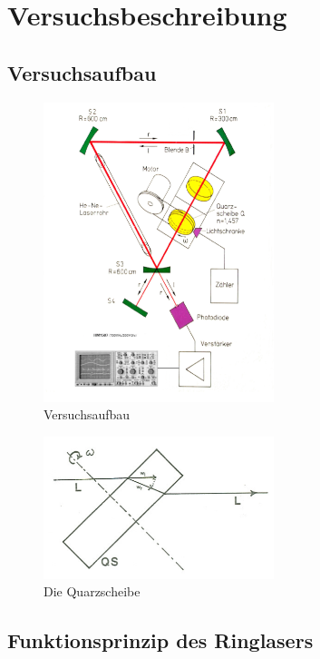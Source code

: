 \section{Versuchsbeschreibung}

\subsection{Versuchsaufbau}

\begin{figure}[H]
	\centering \includegraphics[width=0.6\textwidth]{bilder/aufbau.jpg}
	\caption{Versuchsaufbau}
\end{figure}

\begin{figure}[H]
	\centering \includegraphics[width=0.6\textwidth]{bilder/wiwr.jpg}
	\caption{Die Quarzscheibe}
\end{figure}

\subsection{Funktionsprinzip des Ringlasers}


